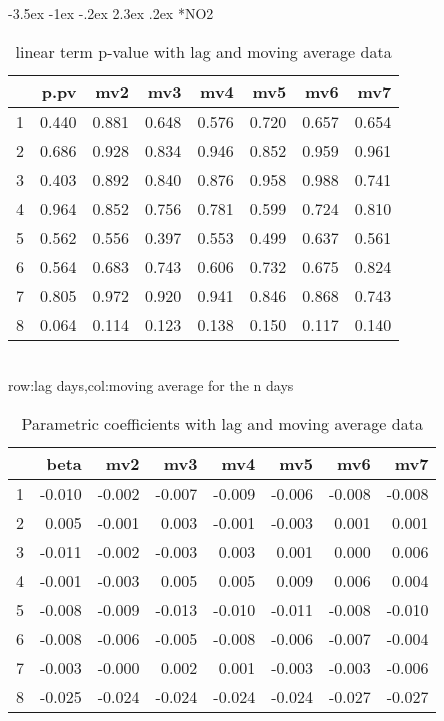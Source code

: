 \documentclass[a4paper, 12pt]{article}
\makeatletter
\def\large{\fontsize{14}{20}\selectfont}
\renewcommand\subsection{\@startsection {subsection}{1}{\z@}%
                                   {-3.5ex \@plus -1ex \@minus -.2ex}%
                                   {2.3ex \@plus.2ex}%
                                   {\centering\normalfont\large\bfseries}}
\makeatother
\begin{document}
\subsection*{NO2}
\begin{table}[h]
\centering
\caption{linear term p-value with lag and moving average data}
\begin{tabular}{rrrrrrrr}
  \hline
 & p.pv & mv2 & mv3 & mv4 & mv5 & mv6 & mv7 \\
  \hline
1 & 0.440 & 0.881 & 0.648 & 0.576 & 0.720 & 0.657 & 0.654 \\
  2 & 0.686 & 0.928 & 0.834 & 0.946 & 0.852 & 0.959 & 0.961 \\
  3 & 0.403 & 0.892 & 0.840 & 0.876 & 0.958 & 0.988 & 0.741 \\
  4 & 0.964 & 0.852 & 0.756 & 0.781 & 0.599 & 0.724 & 0.810 \\
  5 & 0.562 & 0.556 & 0.397 & 0.553 & 0.499 & 0.637 & 0.561 \\
  6 & 0.564 & 0.683 & 0.743 & 0.606 & 0.732 & 0.675 & 0.824 \\
  7 & 0.805 & 0.972 & 0.920 & 0.941 & 0.846 & 0.868 & 0.743 \\
  8 & 0.064 & 0.114 & 0.123 & 0.138 & 0.150 & 0.117 & 0.140 \\
   \hline
\end{tabular}
\\row:lag days,col:moving average for the n days
\end{table}

\begin{table}[h]
\centering
\caption{Parametric coefficients with lag and moving average data}
\begin{tabular}{rrrrrrrr}
  \hline
 & beta & mv2 & mv3 & mv4 & mv5 & mv6 & mv7 \\
  \hline
1 & -0.010 & -0.002 & -0.007 & -0.009 & -0.006 & -0.008 & -0.008 \\
  2 & 0.005 & -0.001 & 0.003 & -0.001 & -0.003 & 0.001 & 0.001 \\
  3 & -0.011 & -0.002 & -0.003 & 0.003 & 0.001 & 0.000 & 0.006 \\
  4 & -0.001 & -0.003 & 0.005 & 0.005 & 0.009 & 0.006 & 0.004 \\
  5 & -0.008 & -0.009 & -0.013 & -0.010 & -0.011 & -0.008 & -0.010 \\
  6 & -0.008 & -0.006 & -0.005 & -0.008 & -0.006 & -0.007 & -0.004 \\
  7 & -0.003 & -0.000 & 0.002 & 0.001 & -0.003 & -0.003 & -0.006 \\
  8 & -0.025 & -0.024 & -0.024 & -0.024 & -0.024 & -0.027 & -0.027 \\
   \hline
\end{tabular}
\end{table}
\clearpage
\end{document}
